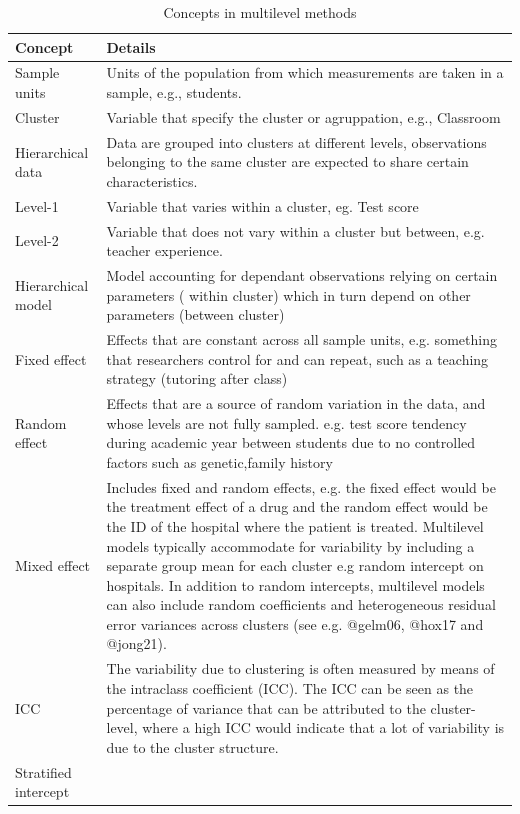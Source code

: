 \documentclass[
  article]{jss}
\begin{document}
\begin{table}

\caption{Concepts in multilevel methods}
\centering
\begin{tabular}[t]{>{\raggedright\arraybackslash}p{3cm}>{\raggedright\arraybackslash}p{12cm}}
\toprule
Concept & Details\\
\midrule
Sample units & Units of the population from which measurements are taken in a sample, e.g., students.\\
Cluster & Variable that specify the cluster or agruppation, e.g., Classroom\\
Hierarchical data & Data are grouped into clusters at different levels, observations belonging to the same cluster are expected to share certain characteristics.\\
Level-1 & Variable that varies within a cluster, eg. Test score\\
Level-2 & Variable that does not vary within a cluster but between, e.g. teacher experience.\\
\addlinespace
Hierarchical model & Model accounting for dependant observations relying on certain parameters ( within cluster) which in turn depend on other parameters (between cluster)\\
Fixed effect & Effects that are constant across all sample units, e.g. something that researchers control for and can repeat, such as  a teaching strategy (tutoring after class)\\
Random effect & Effects that are a source of random variation in the data, and whose levels are not fully sampled. e.g. test score tendency during academic year between students due to no controlled factors such as  genetic,family history\\
Mixed effect & Includes fixed and random effects, e.g. the fixed effect would be the treatment effect of a drug and the random effect would be the ID of the hospital where the patient is treated. Multilevel models typically accommodate for variability by including a separate group mean for each cluster e.g random intercept on hospitals. In addition to random intercepts, multilevel models can also include random coefficients and heterogeneous residual error variances across clusters (see e.g. @gelm06, @hox17 and @jong21).\\
ICC & The variability due to clustering is often measured by means of the intraclass coefficient (ICC). The ICC can be seen as the percentage
of variance that can be attributed to the cluster-level, where a high ICC would indicate that a lot of variability is due to the cluster structure.\\
\addlinespace
Stratified intercept & \\
\bottomrule
\end{tabular}
\end{table}
\end{document}
